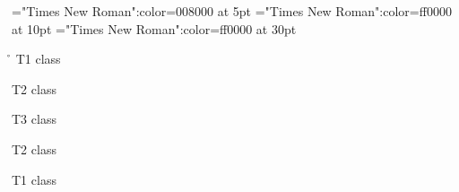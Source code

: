 \font\tctbta="Times New Roman":color=008000 at 5pt
\font\tbta="Times New Roman":color=ff0000 at 10pt
\font\ta="Times New Roman":color=ff0000 at 30pt
 \r\n
\ta T1 class 

\tbta T2 class 

\tctbta T3 class 

\tbta T2 class 

\ta T1 class 


\bye
